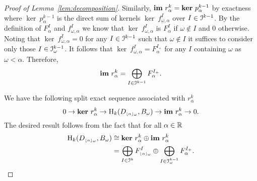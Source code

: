 \begin{proof}[Proof of Lemma~\ref{lem:decomposition}]
  Similarly, $\mathbf{im}~r_\alpha^k = \mathbf{ker}~p_\alpha^{k-1}$ by exactness where $\ker~p_\alpha^{k-1}$ is the direct sum of kernels $\ker~f_{\omega,\alpha}^I$ over $I\in\mathcal{I}^{k-1}$.
  By the definition of $F_\alpha^I$ and $f_{\omega,\alpha}^I$ we know that $\ker~f_{\omega,\alpha}^I$ is $F_\alpha^I$ if $\omega\notin I$ and $0$ otherwise.
  Noting that $\ker~f_{\omega,\alpha}^I = 0$ for any $I\in \mathcal{I}^{k-1}$ such that $\omega\notin I$ it suffices to consider only those $I\in \mathcal{I}_\omega^{k-1}$.
  It follows that $\ker~f_{\omega,\alpha}^I = F_\alpha^{I_+}$ for any $I$ containing $\omega$ as $\omega < \alpha$.
  Therefore,
  \[\mathbf{im}~r_\alpha^k = \bigoplus_{I\in\mathcal{I}^{k-1}} F_\alpha^{I_+}.\]

  We have the following split exact sequence associated with $r_\alpha^k$
  \[ 0\to \mathbf{ker}~r_\alpha^k\to \mathrm{H}_k(D_{\scriptscriptstyle \lfloor\alpha\rfloor_{\omega}}, B_\omega)\to\mathbf{im}~r_\alpha^k\to 0.\]
  The desired result follows from the fact that for all $\alpha\in\mathbb{R}$
  \begin{align*}
    \mathrm{H}_k(D_{\scriptscriptstyle \lfloor\alpha\rfloor_{\omega}}, B_\omega) &\cong \mathbf{ker}~r_\alpha^k\oplus \mathbf{im}~r_\alpha^k\\
      &=\bigoplus_{I\in\mathcal{I}^k} F_{\scriptscriptstyle \lfloor\alpha\rfloor_{\omega}}^I\oplus \bigoplus_{I\in\mathcal{I}_\omega^{k-1}} F_\alpha^{I_+}.
  \end{align*}
\end{proof}
